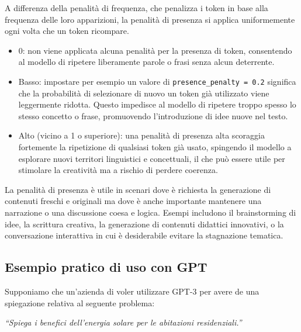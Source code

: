             A differenza della penalità di frequenza, che penalizza i token in base alla frequenza delle loro apparizioni, la penalità di presenza si applica uniformemente ogni volta che un token ricompare.
            \begin{itemize}
                \item 0: non viene applicata alcuna penalità per la presenza di token, consentendo al modello di ripetere liberamente parole o frasi senza alcun deterrente.  
            
                \item Basso: impostare per esempio un valore di \texttt{presence\_penalty = 0.2} significa che la probabilità di selezionare di nuovo un token già utilizzato viene leggermente ridotta. Questo impedisce al modello di ripetere troppo spesso lo stesso concetto o frase, promuovendo l'introduzione di idee nuove nel testo.  
            
                \item Alto (vicino a 1 o superiore): una penalità di presenza alta scoraggia fortemente la ripetizione di qualsiasi token già usato, spingendo il modello a esplorare nuovi territori linguistici e concettuali, il che può essere utile per stimolare la creatività ma a rischio di perdere coerenza. 
            \end{itemize}
            
            La penalità di presenza è utile in scenari dove è richiesta la generazione di contenuti freschi e originali ma dove è anche importante mantenere una narrazione o una discussione coesa e logica. Esempi includono il brainstorming di idee, la scrittura creativa, la generazione di contenuti didattici innovativi, o la conversazione interattiva in cui è desiderabile evitare la stagnazione tematica. 
            
    \subsection{Esempio pratico di uso con GPT}
        Supponiamo che un'azienda di voler utilizzare GPT-3 per avere de una spiegazione relativa al seguente problema: 

        \begin{center}
            \textit{``Spiega i benefici dell'energia solare per le abitazioni residenziali.''}
        \end{center}

